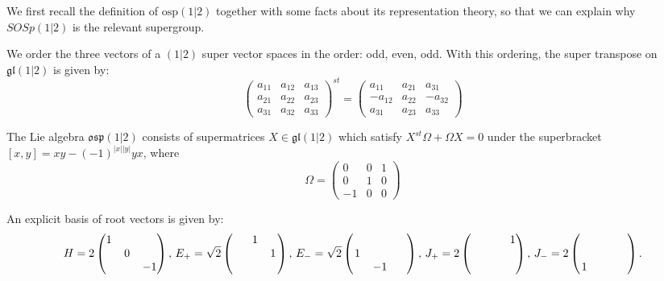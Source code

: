 \documentclass[12pt]{amsart}
\begin{document}
We first recall the definition of $\mathrm{osp}(1|2)$ together with some facts about its representation theory, so that we can explain why $SOSp(1|2)$ is the relevant supergroup.

We order the three vectors of a $(1|2)$ super vector spaces in the order: odd, even, odd.  With this ordering, the super transpose on $\mathfrak{gl}(1|2)$ is given by:
$$\begin{pmatrix}
a_{11} & a_{12} & a_{13} \\
a_{21} & a_{22} & a_{23} \\
a_{31} & a_{32} & a_{33}
\end{pmatrix}^{st} = 
\begin{pmatrix}
a_{11} & a_{21} & a_{31} \\
-a_{12} & a_{22} & -a_{32} \\
a_{31} & a_{23} & a_{33} 
\end{pmatrix}
$$

The Lie algebra $\mathfrak{osp}(1|2)$ consists of supermatrices $X \in \mathfrak{gl}(1|2)$ which satisfy $X^{st} \Omega + \Omega X =0$ under the superbracket $[x,y] = xy - (-1)^{|x||y|} yx$, where 
$$\Omega = \begin{pmatrix} 0 & 0 & 1 \\ 0 & 1 & 0 \\ -1 & 0 & 0 \end{pmatrix}$$

An explicit basis of root vectors is given by:
$$H = 2 \begin{pmatrix} 1 & \hspace{.1in}& \hspace{.1in} \\   & 0 &  \\  &  & -1 \end{pmatrix},\,
E_+ = \sqrt{2} \begin{pmatrix} \hspace{.1in} & 1 & \hspace{.1in} \\   &  & 1 \\  &  &  \end{pmatrix}, \,
E_- = \sqrt{2} \begin{pmatrix} \hspace{.1in} & \hspace{.1in} & \hspace{.1in} \\ 1  &  &  \\  & -1 &  \end{pmatrix}, \,
J_+ = 2 \begin{pmatrix} \hspace{.1in} & \hspace{.1in} & 1 \\   &  &  \\  & &  \end{pmatrix}, \,
J_- = 2 \begin{pmatrix} \hspace{.1in} & \hspace{.1in} & \hspace{.1in} \\   &  &  \\ 1 & &  \end{pmatrix}.
$$
\end{document}
